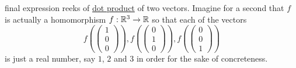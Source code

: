 final expression reeks of \hyperref[def:dot-product]{dot product} of two
vectors. Imagine for a second that $f$ is actually a homomorphism $f:\mathbb{R}^3 \to
\mathbb{R}$ so that each of the vectors
\[
 f \left( 
 \begin{pmatrix}
  1\\
  0\\
  0
 \end{pmatrix}
 \right), f \left( 
 \begin{pmatrix}
 0\\
 1\\
 0
 \end{pmatrix}
 \right), f \left( 
 \begin{pmatrix}
  0\\
  0\\
  1
 \end{pmatrix}
 \right)
\]
is just a real number, say $1$, $2$ and $3$ in order for the sake of
concreteness.
